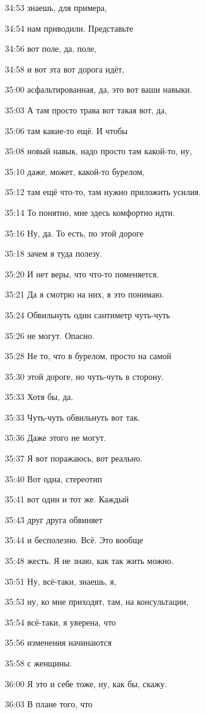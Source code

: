 34:53
знаешь, для примера,

34:54
нам приводили. Представьте

34:56
вот поле, да, поле,

34:58
и вот эта вот дорога идёт,

35:00
асфальтированная, да, это вот ваши навыки.

35:03
А там просто трава вот такая вот, да,

35:06
там какие-то ещё. И чтобы

35:08
новый навык, надо просто там какой-то, ну,

35:10
даже, может, какой-то бурелом,

35:12
там ещё что-то, там нужно приложить усилия.

35:14
То понятно, мне здесь комфортно идти.

35:16
Ну, да. То есть, по этой дороге

35:18
зачем я туда полезу.

35:20
И нет веры, что что-то поменяется.

35:21
Да я смотрю на них, я это понимаю.

35:24
Обвильнуть один сантиметр чуть-чуть

35:26
не могут. Опасно.

35:28
Не то, что в бурелом, просто на самой

35:30
этой дороге, но чуть-чуть в сторону.

35:33
Хотя бы, да.

35:33
Чуть-чуть обвильнуть вот так.

35:36
Даже этого не могут.

35:37
Я вот поражаюсь, вот реально.

35:40
Вот одна, стереотип

35:41
вот один и тот же. Каждый

35:43
друг друга обвиняет

35:44
и бесполезно. Всё. Это вообще

35:48
жесть. Я не знаю, как так жить можно.

35:51
Ну, всё-таки, знаешь, я,

35:53
ну, ко мне приходят, там, на консультации,

35:54
всё-таки, я уверена, что

35:56
изменения начинаются

35:58
с женщины.

36:00
Я это и себе тоже, ну, как бы, скажу.

36:03
В плане того, что

